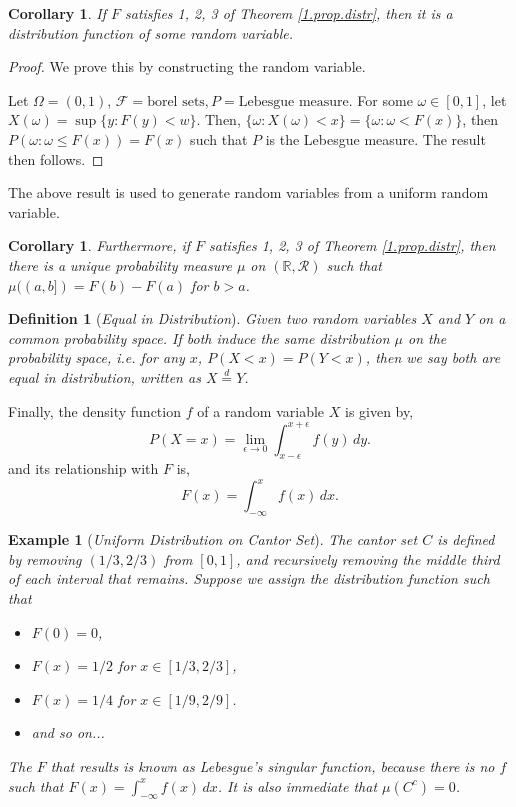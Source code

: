 \documentclass[10pt,a4paper]{article}
\newtheorem{example}{Example}[section]
\newtheorem{corollary}[theorem]{Corollary}
\newtheorem{definition}[theorem]{Definition}
\numberwithin{equation}{subsection}
\begin{document}
\begin{corollary}
	If $F$ satisfies 1, 2, 3 of Theorem \ref{1.prop.distr}, then
	it is a distribution function of some random variable. 
\end{corollary}
\begin{proof}

	We prove this by constructing the random variable.  

	Let $\Omega = (0,1)$, $\mathcal{F} = \text{borel sets}, P = \text{Lebesgue measure}$. For some
	$\omega \in [0,1]$, let $X(\omega) = \sup \{y:F(y) < w\}$. Then, $\{\omega: X(\omega) < x\} = \{\omega:\omega < F(x)\}$,
	then $P(\omega:\omega\leq F(x)) = F(x)$ such that $P$ is the Lebesgue measure. The result then follows. 
\end{proof}

The above result is used to generate random variables from
a uniform random variable. 

\begin{corollary}
	Furthermore, if $F$ satisfies 1, 2, 3 of Theorem \ref{1.prop.distr}, then 
	there is a unique probability measure $\mu$ on $(\mathbb{R}, \mathcal{R})$ such that
	$\mu((a, b]) = F(b) - F(a)$ for $b>a$. 
\end{corollary}


\begin{definition}[\emph{Equal in Distribution}]
	Given two random variables $X$ and $Y$ on a common probability space. 
	If both induce the same distribution $\mu$ on the probability space, 
	i.e. for any $x$, $P(X<x) = P(Y<x)$, then we say both are equal
	in distribution, written as $X \stackrel{d}{=} Y$. 
\end{definition}

Finally, the density function $f$ of a random variable $X$ is given by, 
\[
	P(X=x) = \lim_{\epsilon \rightarrow 0} \int^{x+\epsilon}_{x-\epsilon} f(y) \, dy. 
\]
and its relationship with $F$ is,
\[
	F(x) = \int_{-\infty}^x f(x) \, dx. 
\]

\begin{example}[\emph{Uniform Distribution on Cantor Set}]
	The cantor set $C$ is defined by removing $(1/3, 2/3)$ from
	$[0,1]$, and recursively removing the middle third of each interval
	that remains. Suppose we assign the distribution function such that
	\begin{itemize}
		\item $F(0) = 0$,
		\item $F(x) = 1/2$ for $x \in [1/3, 2/3]$,
		\item $F(x) = 1/4$ for $x \in [1/9, 2/9]$. 
		\item and so on...
	\end{itemize}
	The $F$ that results is known as Lebesgue's singular function,
	because there is no $f$ such that $F(x) = \int_{-\infty}^x f(x) \, dx$. It is also immediate that $\mu(C^c) = 0$. 
\end{example}
\end{document}
